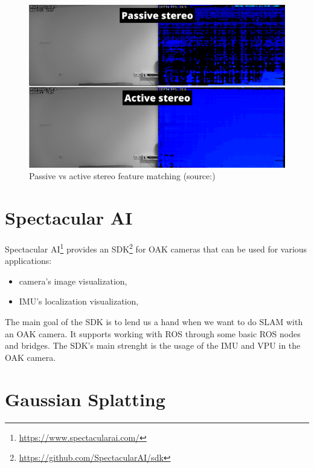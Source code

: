 \begin{figure}[H]
    \centering
    \includegraphics[width=150mm, keepaspectratio]{figures/active-vs-passive-stereo.png}
    \caption{Passive vs active stereo feature matching (source:\cite{ActivePassiveStereo})}
    \label{fig:active-passive-stereo}
\end{figure}

\section{Spectacular AI}

Spectacular AI\footnote{\url{https://www.spectacularai.com/}} provides an SDK\footnote{\url{https://github.com/SpectacularAI/sdk}} for OAK cameras that can be used for various applications:
\begin{itemize}
    \item camera's image visualization,
    \item IMU's localization visualization,
\end{itemize}
The main goal of the SDK is to lend us a hand when we want to do SLAM with an OAK camera. It supports working with ROS through some basic ROS nodes and bridges. The SDK's main strenght is the usage of the IMU and VPU in the OAK camera.

\section{Gaussian Splatting}

